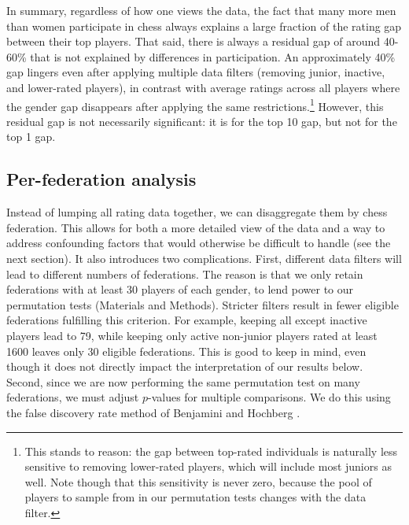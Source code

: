 \documentclass[9pt,twocolumn,twoside,lineno]{pnas-new}
\newcommand{\MM}{Materials and Methods}
\begin{document}
In summary, regardless of how one views the data, the fact that many more men than women participate in chess always explains a large fraction of the rating gap between their top players. That said, there is always a residual gap of around 40-60\% that is not explained by differences in participation. An approximately 40\% gap lingers even after applying multiple data filters (removing junior, inactive, and lower-rated players), in contrast with average ratings across all players where the gender gap disappears after applying the same restrictions.\footnote{This stands to reason: the gap between top-rated individuals is naturally less sensitive to removing lower-rated players, which will include most juniors as well. Note though that this sensitivity is never zero, because the pool of players to sample from in our permutation tests changes with the data filter.} However, this residual gap is not necessarily significant: it is for the top 10 gap, but not for the top 1 gap.


\subsection*{Per-federation analysis}

Instead of lumping all rating data together, we can disaggregate them by chess federation. This allows for both a more detailed view of the data and a way to address confounding factors that would otherwise be difficult to handle (see the next section). It also introduces two complications. First, different data filters will lead to different numbers of federations. The reason is that we only retain federations with at least 30 players of each gender, to lend power to our permutation tests (\MM). Stricter filters result in fewer eligible federations fulfilling this criterion. For example, keeping all except inactive players lead to 79, while keeping only active non-junior players rated at least 1600 leaves only 30 eligible federations. This is good to keep in mind, even though it does not directly impact the interpretation of our results below. Second, since we are now performing the same permutation test on many federations, we must adjust $p$-values for multiple comparisons. We do this using the false discovery rate method of Benjamini and Hochberg \cite{BH95}.
\end{document}
